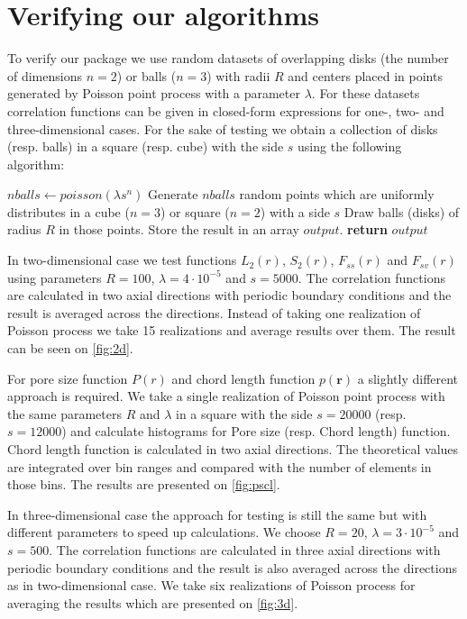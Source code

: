 \documentclass[reprint,amsmath,amssymb,aps,pre,showkeys,showpacs,nofootinbib]{revtex4-1}
\begin{document}
\section{Verifying our algorithms}
\label{sec:verification}
To verify our package we use random datasets of overlapping disks (the number of
dimensions $n = 2$) or balls ($n = 3$) with radii $R$ and centers placed in
points generated by Poisson point process with a parameter $\lambda$. For these
datasets correlation functions can be given in closed-form expressions for one-,
two- and three-dimensional cases. For the sake of testing we obtain a collection
of disks (resp. balls) in a square (resp. cube) with the side $s$ using the
following algorithm:
\begin{algorithmic}[1]
  \label{testdata}
    \State $nballs \gets poisson(\lambda s^n)$ 
    \State Generate $nballs$ random points which are uniformly distributes in
    a cube ($n = 3$) or square ($n = 2$) with a side $s$
    \State Draw balls (disks) of radius $R$ in those points. Store the result in
    an array $output$.
    \State \textbf{return} $output$
  \EndProcedure
\end{algorithmic}

In two-dimensional case we test functions $L_2(r)$, $S_2(r)$, $F_{ss}(r)$ and
$F_{sv}(r)$ using parameters $R = 100$, $\lambda = 4\cdot10^{-5}$ and
$s = 5000$. The correlation functions are calculated in two axial directions
with periodic boundary conditions and the result is averaged across the
directions. Instead of taking one realization of Poisson process we take 15
realizations and average results over them. The result can be seen on
\cref{fig:2d}.

For pore size function $P(r)$ and chord length function $p(\bm{r})$ a slightly
different approach is required. We take a single realization of Poisson point
process with the same parameters $R$ and $\lambda$ in a square with the side
$s = 20000$ (resp. $s = 12000$) and calculate histograms for Pore size
(resp. Chord length) function. Chord length function is calculated in two axial
directions. The theoretical values are integrated over bin ranges and compared
with the number of elements in those bins. The results are presented on
\cref{fig:pscl}.

In three-dimensional case the approach for testing is still the same but with
different parameters to speed up calculations. We choose $R = 20$,
$\lambda = 3\cdot10^{-5}$ and $s = 500$. The correlation functions are
calculated in three axial directions with periodic boundary conditions and the
result is also averaged across the directions as in two-dimensional
case. We take six realizations of Poisson process for averaging the results
which are presented on \cref{fig:3d}.
\end{document}
